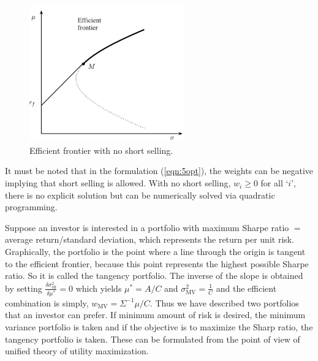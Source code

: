 	\begin{figure}[h!]
	   \centering
	   \includegraphics[width=0.6\textwidth]{chapters/chapter_apm/figures/frontier.png} 
	   \caption{Efficient frontier with no short selling. \label{fig:frontier}}
	\end{figure}
It must be noted that in the formulation (\ref{eqn:5opt}), the weights can be negative implying that short selling is allowed. With no short selling, $w_i \geq 0$ for all `$i$', there is no explicit solution but can be numerically solved via quadratic programming. 


Suppose an investor is interested in a portfolio with maximum Sharpe ratio $=$ average return/standard deviation, which represents the return per unit risk. Graphically, the portfolio is the point where a line through the origin is tangent to the efficient frontier, because this point represents the highest possible Sharpe ratio. So it is called the tangency portfolio. The inverse of the slope is obtained by setting $\frac{\delta \sigma^2_{\text{eff}}}{\delta \mu^*}=0$ which yields $\mu^*=A/C$ and $\sigma_{\text{MV}}^2=\frac{1}{C}$ and the efficient combination is simply, $w_{\text{MV}}=\Sigma^{-1} \mu/C$. Thus we have described two portfolios that an investor can prefer. If minimum amount of risk is desired, the minimum variance portfolio is taken and if the objective is to maximize the Sharp ratio, the tangency portfolio is taken. These can be formulated from the point of view of unified theory of utility maximization. 


